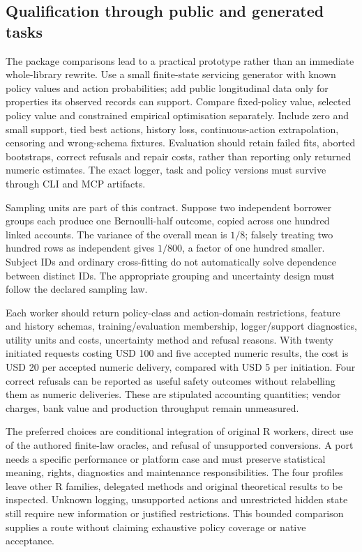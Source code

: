 \subsection{Qualification through public and generated tasks}
The package comparisons lead to a practical prototype rather than an immediate
whole-library rewrite. Use a small finite-state servicing generator with known
policy values and action probabilities; add public longitudinal data only for
properties its observed records can support. Compare fixed-policy value, selected
policy value and constrained empirical optimisation separately. Include zero and
small support, tied best actions, history loss, continuous-action extrapolation,
censoring and wrong-schema fixtures. Evaluation should retain failed fits,
aborted bootstraps, correct refusals and repair costs, rather than reporting only
returned numeric estimates. The exact logger, task and policy versions must survive
through CLI and MCP artifacts.

Sampling units are part of this contract. Suppose two independent borrower groups
each produce one Bernoulli-half outcome, copied across one hundred linked accounts.
The variance of the overall mean is $1/8$; falsely treating two hundred rows as
independent gives $1/800$, a factor of one hundred smaller. Subject IDs and ordinary
cross-fitting do not automatically solve dependence between distinct IDs. The
appropriate grouping and uncertainty design must follow the declared sampling law.
\citep{exec24_policiesr_reference}

Each worker should return policy-class and action-domain restrictions, feature and
history schemas, training/evaluation membership, logger/support diagnostics, utility
units and costs, uncertainty method and refusal reasons. With twenty initiated
requests costing USD 100 and five accepted numeric results, the cost is USD 20 per
accepted numeric delivery, compared with USD 5 per initiation. Four correct refusals
can be reported as useful safety outcomes without relabelling them as numeric
deliveries. These are stipulated accounting quantities; vendor charges, bank value
and production throughput remain unmeasured.~\citep{exec24_policiesr_reference}

The preferred choices are conditional integration of original R workers, direct use
of the authored finite-law oracles, and refusal of unsupported conversions. A port
needs a specific performance or platform case and must preserve statistical meaning,
rights, diagnostics and maintenance responsibilities. The four profiles leave other
R families, delegated methods and original theoretical results to be inspected.
Unknown logging, unsupported actions and unrestricted hidden state still require
new information or justified restrictions. This bounded comparison supplies a route
without claiming exhaustive policy coverage or native acceptance.


